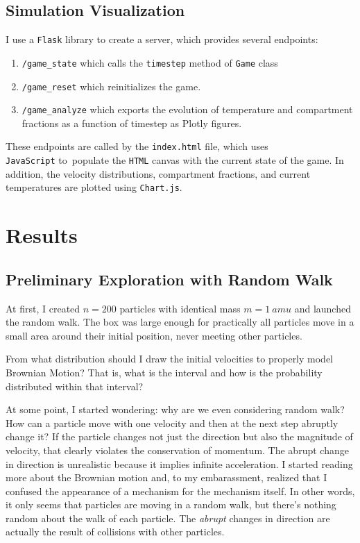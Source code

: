 \documentclass[12pt]{article}
\begin{document}
\subsection{Simulation Visualization}

I use a \texttt{Flask} library to create a server, which provides several endpoints:
\begin{enumerate}
    \item \texttt{/game\_state} which calls the \texttt{timestep} method of \texttt{Game} class
    \item \texttt{/game\_reset} which reinitializes the game.
    \item \texttt{/game\_analyze} which exports the evolution of temperature and compartment fractions as a function of timestep as Plotly figures.
\end{enumerate}

These endpoints are called by the \texttt{index.html} file, which uses \\\texttt{JavaScript} to~populate the \texttt{HTML} canvas with the current state of the game. In addition, the velocity distributions, compartment fractions, and current temperatures are plotted using \texttt{Chart.js}.
    

\section{Results}
\subsection{Preliminary Exploration with Random Walk}
At first, I created $n=200$ particles with identical mass $m=\qty{1}{amu}$ and launched the random walk. The box was large enough for practically all particles move in a small area around their initial position, never meeting other particles.

\begin{explorationbox}
    From what distribution should I draw the initial velocities to properly model Brownian Motion? That is, what is the interval and how is the probability distributed within that interval? 
\end{explorationbox}

At some point, I started wondering: why are we even considering random walk? How can a particle move with one velocity and then at the next step abruptly change it? If the particle changes not just the direction but also the magnitude of velocity, that clearly violates the conservation of momentum. The abrupt change in direction is unrealistic because it implies infinite acceleration. I started reading more about the Brownian motion and, to my embarassment, realized that I confused the appearance of a mechanism for the mechanism itself. In other words, it only seems that particles are moving in a random walk, but there's nothing random about the walk of each particle. The \textit{abrupt} changes in direction are actually the result of collisions with other particles.
\end{document}
